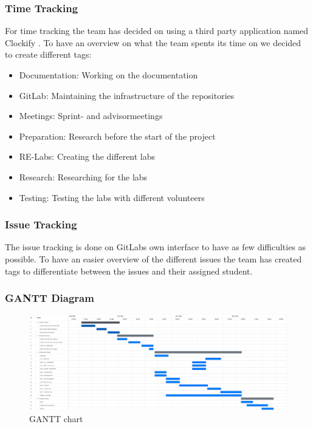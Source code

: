 \subsubsection*{Time Tracking}
For time tracking the team has decided on using a third party application named Clockify \cite{clockify}. To have an overview on what the team spents its time on we decided to create different tags: 
\begin{itemize}
    \item Documentation: Working on the documentation
    \item GitLab: Maintaining the infrastructure of the repositories
    \item Meetings: Sprint- and advisormeetings
    \item Preparation: Research before the start of the project
    \item RE-Labs: Creating the different labs
    \item Research: Researching for the labs
    \item Testing: Testing the labs with different volunteers
\end{itemize}

\subsubsection*{Issue Tracking}
The issue tracking is done on GitLabs own interface to have as few difficulties as possible. To have an easier overview of the different issues the team has created tags to differentiate between the issues and their assigned student. 

\subsubsection*{GANTT Diagram}
\begin{figure}[H]
    \includegraphics[width=\linewidth]{resources/gantt.png}
    \caption{GANTT chart}
    \label{gantt_figure}
  \end{figure}

